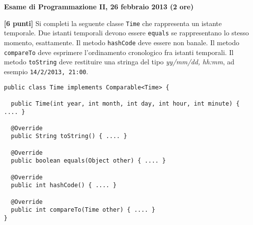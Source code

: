 \documentclass{article}[10pt]
\newcounter{esnu}
\newenvironment{esercizio}{\medskip \noindent {\bf Esercizio\addtocounter{esnu}{1} \arabic{esnu}}}{}
\begin{document}
\begin{center} {\bf Esame di Programmazione II, 26 febbraio 2013 (2 ore)}\end{center}

\begin{esercizio}
\textbf{[6 punti]}
Si completi la seguente classe \texttt{Time} che rappresenta un istante temporale.
Due istanti temporali devono essere \texttt{equals} se rappresentano lo stesso momento,
esattamente. Il metodo \texttt{hashCode} deve essere non banale. Il metodo
\texttt{compareTo} deve esprimere l'ordinamento cronologico fra istanti temporali.
Il metodo \texttt{toString} deve restituire una stringa del tipo
\textit{yy/mm/dd, hh:mm}, ad esempio \texttt{14/2/2013, 21:00}.
%
{\small
\begin{verbatim}
public class Time implements Comparable<Time> {

  public Time(int year, int month, int day, int hour, int minute) { .... }

  @Override
  public String toString() { .... }

  @Override
  public boolean equals(Object other) { .... }

  @Override
  public int hashCode() { .... }

  @Override
  public int compareTo(Time other) { .... }
}
\end{verbatim}
}
\end{esercizio}
\end{document}
